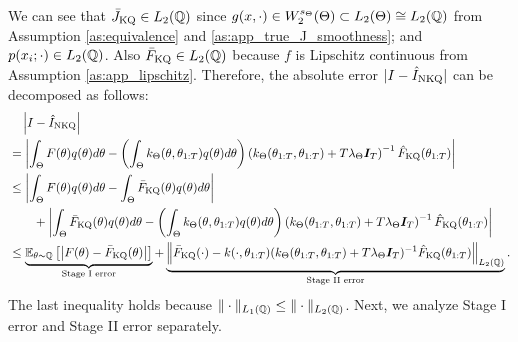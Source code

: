 We can see that $\bar{J}_{\text{KQ}} \in L_2(\mathbb{Q})$ since $g(x, \cdot) \in W_2^{s_\Theta}(\Theta) \subset L_2(\Theta) \cong L_2(\mathbb{Q})$ from Assumption \ref{as:equivalence} and \ref{as:app_true_J_smoothness}; and $p(x_i; \cdot) \in L_2(\mathbb{Q})$. Also $\bar{F}_{\text{KQ}} \in L_2(\mathbb{Q})$ because $f$ is Lipschitz continuous from Assumption \ref{as:app_lipschitz}.
Therefore, the absolute error $| I - \hat{I}_{\text{NKQ}}|$ can be decomposed as follows:
\begin{align}\label{eq:stage_i_stage_ii_decomposition}
& \quad \left| I - \hat{I}_{\text{NKQ}} \right| \nonumber \\
& = \left| \int_\Theta F(\theta) q(\theta) d\theta  - \left( \int_\Theta k_\Theta(\theta, \theta_{1:T}) q(\theta) d\theta  \right) \left( k_\Theta(\theta_{1:T}, \theta_{1:T}) + T \lambda_\Theta \boldsymbol{I}_T \right)^{-1} \hat{F}_{\text{KQ}}(\theta_{1:T}) \right| \nonumber \\
&\leq \left| \int_\Theta F(\theta) q(\theta) d\theta  - \int_\Theta \bar{F}_{\text{KQ}}(\theta) q(\theta) d\theta  \right| \nonumber \\
& \quad\quad + \left| \int_\Theta \bar{F}_{\text{KQ}}(\theta) q(\theta) d\theta  - \left( \int_\Theta k_\Theta(\theta, \theta_{1:T}) q(\theta) d\theta  \right) \left( k_\Theta(\theta_{1:T}, \theta_{1:T}) + T \lambda_\Theta \boldsymbol{I}_T \right)^{-1} \hat{F}_{\text{KQ}}(\theta_{1:T}) \right| \nonumber \\
&\leq \underbrace{  \operatorname{\mathbb{E}}_{\theta \sim \mathbb{Q}} \left[ \left| F(\theta) - \bar{F}_{\text{KQ}}(\theta) \right| \right]}_{\text{Stage I error}} + \underbrace{ \left \| \bar{F}_{\text{KQ}}(\cdot) - k(\cdot, \theta_{1:T}) (k_\Theta(\theta_{1:T}, \theta_{1:T}) + T \lambda_\Theta \boldsymbol{I}_T )^{-1} \hat{F}_{\text{KQ}}(\theta_{1:T}) \right \|_{L_2(\mathbb{Q} )} }_{\text{Stage II error}}  .
\end{align}
The last inequality holds because $\|\cdot\|_{L_1(\mathbb{Q})} \leq \|\cdot\|_{L_2(\mathbb{Q})}$. Next, we analyze Stage I error and Stage II error separately.


